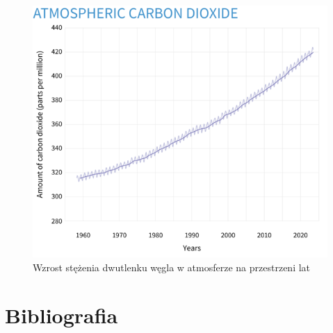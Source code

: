 \begin{figure}
    \includegraphics[width=\textwidth]{zdj/more-co2.png}
    \caption{Wzrost stężenia dwutlenku węgla w atmosferze na przestrzeni lat}
\end{figure}

\section{Bibliografia}

\printbibliography


